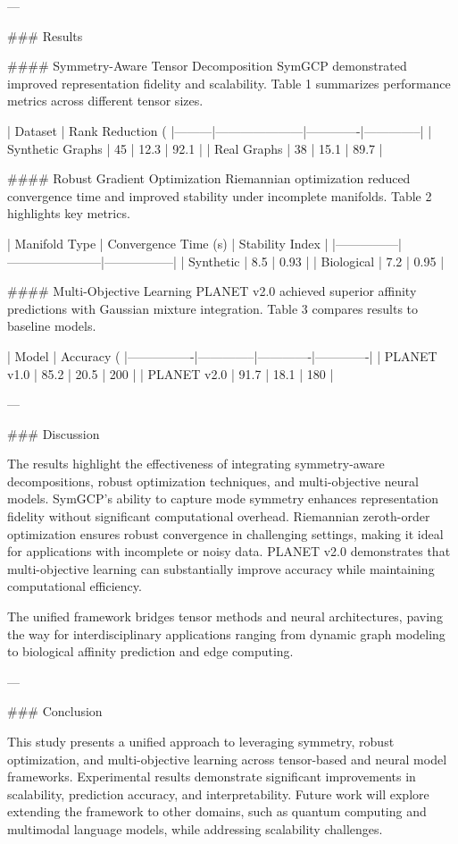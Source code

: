 ---

### Results

#### Symmetry-Aware Tensor Decomposition
SymGCP demonstrated improved representation fidelity and scalability. Table 1 summarizes performance metrics across different tensor sizes.

| Dataset | Rank Reduction (%
|---------|---------------------|-------------|--------------|
| Synthetic Graphs | 45 | 12.3 | 92.1 |
| Real Graphs       | 38 | 15.1 | 89.7 |

#### Robust Gradient Optimization
Riemannian optimization reduced convergence time and improved stability under incomplete manifolds. Table 2 highlights key metrics.

| Manifold Type | Convergence Time (s) | Stability Index |
|---------------|-----------------------|-----------------|
| Synthetic     | 8.5                 | 0.93            |
| Biological    | 7.2                 | 0.95            |

#### Multi-Objective Learning
PLANET v2.0 achieved superior affinity predictions with Gaussian mixture integration. Table 3 compares results to baseline models.

| Model          | Accuracy (%
|----------------|--------------|-------------|-------------|
| PLANET v1.0    | 85.2         | 20.5        | 200         |
| PLANET v2.0    | 91.7         | 18.1        | 180         |

---

### Discussion

The results highlight the effectiveness of integrating symmetry-aware decompositions, robust optimization techniques, and multi-objective neural models. SymGCP's ability to capture mode symmetry enhances representation fidelity without significant computational overhead. Riemannian zeroth-order optimization ensures robust convergence in challenging settings, making it ideal for applications with incomplete or noisy data. PLANET v2.0 demonstrates that multi-objective learning can substantially improve accuracy while maintaining computational efficiency.

The unified framework bridges tensor methods and neural architectures, paving the way for interdisciplinary applications ranging from dynamic graph modeling to biological affinity prediction and edge computing.

---

### Conclusion

This study presents a unified approach to leveraging symmetry, robust optimization, and multi-objective learning across tensor-based and neural model frameworks. Experimental results demonstrate significant improvements in scalability, prediction accuracy, and interpretability. Future work will explore extending the framework to other domains, such as quantum computing and multimodal language models, while addressing scalability challenges.

